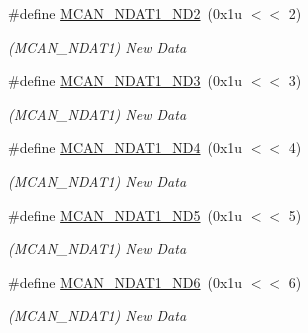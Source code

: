 \begin{DoxyCompactItemize}
\#define \mbox{\hyperlink{group__SAMV71__MCAN_gaebaa1cee4b534bff06778d4c847e50d3}{M\+C\+A\+N\+\_\+\+N\+D\+A\+T1\+\_\+\+N\+D2}}~(0x1u $<$$<$ 2)
\begin{DoxyCompactList}\small\item\em (M\+C\+A\+N\+\_\+\+N\+D\+A\+T1) New Data \end{DoxyCompactList}\item 
\mbox{\label{group__SAMV71__MCAN_gab712b46dc1fdc6f634782f3aa001b9ab}} 
\#define \mbox{\hyperlink{group__SAMV71__MCAN_gab712b46dc1fdc6f634782f3aa001b9ab}{M\+C\+A\+N\+\_\+\+N\+D\+A\+T1\+\_\+\+N\+D3}}~(0x1u $<$$<$ 3)
\begin{DoxyCompactList}\small\item\em (M\+C\+A\+N\+\_\+\+N\+D\+A\+T1) New Data \end{DoxyCompactList}\item 
\mbox{\label{group__SAMV71__MCAN_ga3b9d96d794c579d95f36462f469d2339}} 
\#define \mbox{\hyperlink{group__SAMV71__MCAN_ga3b9d96d794c579d95f36462f469d2339}{M\+C\+A\+N\+\_\+\+N\+D\+A\+T1\+\_\+\+N\+D4}}~(0x1u $<$$<$ 4)
\begin{DoxyCompactList}\small\item\em (M\+C\+A\+N\+\_\+\+N\+D\+A\+T1) New Data \end{DoxyCompactList}\item 
\mbox{\label{group__SAMV71__MCAN_ga73d7da4f83ad1a65335fc27462d41521}} 
\#define \mbox{\hyperlink{group__SAMV71__MCAN_ga73d7da4f83ad1a65335fc27462d41521}{M\+C\+A\+N\+\_\+\+N\+D\+A\+T1\+\_\+\+N\+D5}}~(0x1u $<$$<$ 5)
\begin{DoxyCompactList}\small\item\em (M\+C\+A\+N\+\_\+\+N\+D\+A\+T1) New Data \end{DoxyCompactList}\item 
\mbox{\label{group__SAMV71__MCAN_ga1e868644b41a62aa4c594c99e270c96b}} 
\#define \mbox{\hyperlink{group__SAMV71__MCAN_ga1e868644b41a62aa4c594c99e270c96b}{M\+C\+A\+N\+\_\+\+N\+D\+A\+T1\+\_\+\+N\+D6}}~(0x1u $<$$<$ 6)
\begin{DoxyCompactList}\small\item\em (M\+C\+A\+N\+\_\+\+N\+D\+A\+T1) New Data \end{DoxyCompactList}\item 
$$
\end{DoxyCompactItemize}
